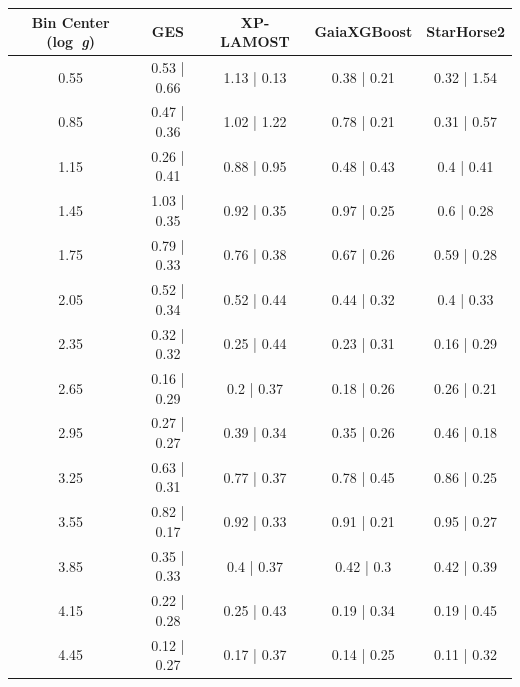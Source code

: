 \documentclass{aa}
\def\logg{\mbox{log~{\it g}}}
\begin{document}
\begin{appendix}
\begin{table}[!ht]
    \centering
    \begin{tabular}{c c c c c}
    \hline\hline
        Bin Center (\logg) & GES & XP-LAMOST & GaiaXGBoost & StarHorse2 \\
    \hline
        0.55 & 0.53 | 0.66 & 1.13 | 0.13 & 0.38 | 0.21 & 0.32 | 1.54 \\ 
        0.85 & 0.47 | 0.36 & 1.02 | 1.22 & 0.78 | 0.21 & 0.31 | 0.57 \\ 
        1.15 & 0.26 | 0.41 & 0.88 | 0.95 & 0.48 | 0.43 & 0.4 | 0.41 \\ 
        1.45 & 1.03 | 0.35 & 0.92 | 0.35 & 0.97 | 0.25 & 0.6 | 0.28 \\ 
        1.75 & 0.79 | 0.33 & 0.76 | 0.38 & 0.67 | 0.26 & 0.59 | 0.28 \\ 
        2.05 & 0.52 | 0.34 & 0.52 | 0.44 & 0.44 | 0.32 & 0.4 | 0.33 \\ 
        2.35 & 0.32 | 0.32 & 0.25 | 0.44 & 0.23 | 0.31 & 0.16 | 0.29 \\ 
        2.65 & 0.16 | 0.29 & 0.2 | 0.37 & 0.18 | 0.26 & 0.26 | 0.21 \\ 
        2.95 & 0.27 | 0.27 & 0.39 | 0.34 & 0.35 | 0.26 & 0.46 | 0.18 \\ 
        3.25 & 0.63 | 0.31 & 0.77 | 0.37 & 0.78 | 0.45 & 0.86 | 0.25 \\ 
        3.55 & 0.82 | 0.17 & 0.92 | 0.33 & 0.91 | 0.21 & 0.95 | 0.27 \\ 
        3.85 & 0.35 | 0.33 & 0.4 | 0.37 & 0.42 | 0.3 & 0.42 | 0.39 \\ 
        4.15 & 0.22 | 0.28 & 0.25 | 0.43 & 0.19 | 0.34 & 0.19 | 0.45 \\ 
        4.45 & 0.12 | 0.27 & 0.17 | 0.37 & 0.14 | 0.25 & 0.11 | 0.32 \\ 
    \hline
    \end{tabular}
\end{table}



\end{appendix}
\end{document}
